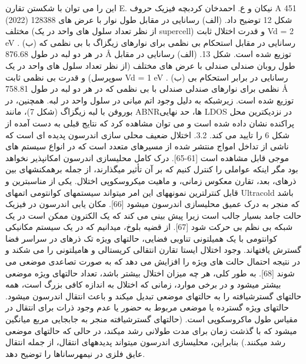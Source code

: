 این را می توان با شکستن تقارن E. نیکان و ع. احمدخان کردبچه فیزیک حروف A 451 (2022) 128388 شکل 12 توضیح داد. (الف) رسانایی در مقابل طول نوار با عرض های مختلف (از نظر تعداد سلول های واحد در یک supercell) و قدرت اختلال ثابت Vd = 2 eV . (ب) رسانایی در مقابل استحکام بی نظمی برای نوارهای زیگزاگ با بی نظمی که در هر دو لبه در طول 876.68 Å توزیع شده است. شکل 13. (الف) رسانایی در مقابل طول روبان صندلی صندلی با عرض های مختلف (از نظر تعداد سلول های واحد در یک سوپرسل) و قدرت بی نظمی ثابت Vd = 1 eV . (ب) رسانایی در برابر استحکام بی نظمی برای نوارهای صندلی صندلی با بی نظمی که در هر دو لبه در طول 758.81 Å توزیع شده است. زیرشبکه به دلیل وجود اتم میانی در سلول واحد در لبه. همچنین، در بوروفن با لبه زیگزاگ (شکل 7)، مانند ABNRها، حد نهایی LDOS در نزدیکترین محل پراکنده نشان داده شده است و می توان مشاهده کرد که نتایج قبلی به دست آمده از شکل 6 را تایید می کند. 3.2. اختلال ضعیف محلی سازی اندرسون پدیده ای است که ناشی از تداخل امواج منتشر شده از مسیرهای متعدد است که در انواع سیستم های موجی قابل مشاهده است [61-65]. درک کامل محلیسازی اندرسون امکانپذیر نخواهد بود مگر اینکه عواملی را کنترل کنیم که بر آن تأثیر میگذارند، از جمله برهمکنشهای بین ذرهای، بعد، تقارن معکوس زمانی، و ماهیت میکروسکوپی اختلال. یکی از مناسبترین و قابل کنترلترین نمونههای این امر میتواند سیستمهای کوانتومی اتمهای Ultracold باشد که منجر به درک عمیق محلیسازی اندرسون میشود [66]. مکان یابی اندرسون در فیزیک حالت جامد بسیار جالب است زیرا پیش بینی می کند که یک الکترون ممکن است در یک شبکه بی نظم بی حرکت شود [67]. از قضیه بلوخ، میدانیم که در یک سیستم مکانیکی کوانتومی با یک همیلتونی تناوبی فضایی، حالتهای ویژه تک ذرهای در سراسر فضا گسترش یافتهاند. وجود اختلال ایستا تقارن انتقالی کریستالی و هامیلتونی را می شکند و در نتیجه احتمال حالت های ویژه را افزایش می دهد که به صورت تصاعدی موضعی می شوند [68]. به طور کلی، هر چه میزان اختلال بیشتر باشد، تعداد حالتهای ویژه موضعی بیشتر میشود و در برخی موارد، زمانی که اختلال به اندازه کافی بزرگ است، همه حالتهای گسترشیافته را به حالتهای موضعی تبدیل میکند و باعث انتقال اندرسون میشود. حالتهای ویژه گسترده یا موضعی مربوط به حضور یا عدم وجود ذرات برای انتقال در مقیاس طول ماکروسکوپی است. (حالتهای گسترشیافته منجر به جابجایی مربع میانگین میشود که با گذشت زمان برای مدت طولانی رشد میکند، در حالی که حالتهای موضعی رشد میکنند.) بنابراین، محلیسازی اندرسون میتواند پدیدههای انتقال، از جمله انتقال عایق فلزی در نیمهرساناها را توضیح دهد.
